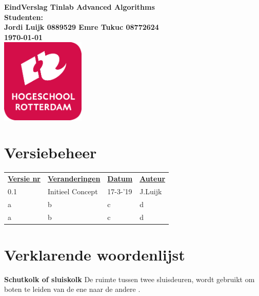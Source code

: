 \documentclass{article}
\begin{document}
\sffamily



\begin{titlepage}
  \centering
    \vfill
    {\bfseries\Huge
      EindVerslag Tinlab Advanced Algorithms \\
        \vskip2cm
      }
      {\bfseries\Large
        Studenten:\\
      }
      {
        \bfseries\normalsize
        Jordi Luijk 0889529 \newline
        Emre Tukuc 08772624 \newline\\
        \vskip1cm
        \today\\
    }    
    \vfill
    \includegraphics[width=4cm]{logohr.png} %
    \vfill
    \vfill
\end{titlepage}
\newpage
\tableofcontents

\newpage
\section{Versiebeheer}

\begin{table}[htp]
\begin{tabular}{llll}
\rowcolor[HTML]{9AFF99} 
{\ul \textbf{Versie nr}} & {\ul \textbf{Veranderingen}} & {\ul \textbf{Datum}} & {\ul \textbf{Auteur}} \\
0.1 & Initieel Concept & 17-3-'19 & J.Luijk \\     
a & b & c & d \\     
a & b & c & d   
\end{tabular}
\end{table}
\newpage

\section{Verklarende woordenlijst}
\textbf{Schutkolk of sluiskolk} \newline
De ruimte tussen twee sluisdeuren, wordt gebruikt om boten te leiden van de ene naar de andere \cite{definitionschutkolk}.
\newpage
\end{document}
